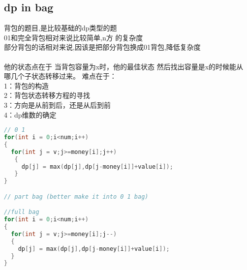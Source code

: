 \documentclass[a4paper,11pt]{article}
\begin{document}
\subsection{dp in bag}
\begin{CJK}{UTF8}{gkai}
背包的题目,是比较基础的dp类型的题\\
01和完全背包相对来说比较简单,n方 的复杂度\\
部分背包的话相对来说,因该是把部分背包换成01背包,降低复杂度\\
\\
他的状态点在于
当背包容量为x时，他的最佳状态
然后找出容量是x的时候能从
哪几个子状态转移过来。
难点在于：\\
1：背包的构造\\
2：背包状态转移方程的寻找\\
3：方向是从前到后，还是从后到前\\
4：dp维数的确定\\
\end{CJK}

\begin{lstlisting}[language = C]
// 0 1
for(int i = 0;i<num;i++)
{
  for(int j = v;j>=money[i];j++)
   {
     dp[j] = max(dp[j],dp[j-money[i]]+value[i]);
   }
}

// part bag (better make it into 0 1 bag)

//full bag
for(int i = 0;i<num;i++)
{
  for(int j = v;j>=money[i];j--)
  {
    dp[j] = max(dp[j],dp[j-money[i]]+value[i]);
  }
}


\end{lstlisting}
\end{document}
